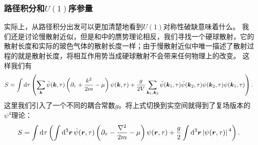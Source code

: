\documentclass[hyperref, UTF8, a4paper]{ctexart}
\begin{document}
\subsubsection{路径积分和$U(1)$序参量}

实际上，从路径积分出发可以更加清楚地看到$U(1)$对称性破缺意味着什么。%
我们还是讨论慢散射近似，但是和中的赝势理论相反，我们寻找一个硬球散射，它的散射长度和实际的玻色气体的散射长度一样；由于慢散射近似中唯一描述了散射过程的就是散射长度，将相互作用势当成硬球散射不会带来任何物理上的改变。
这样我们有
\[
    S = \int \dd{\tau} \left( 
        \sum_{\vb*{k}} \bar{\psi}(\vb*{k}, \tau) \left( \partial_\tau + \frac{k^2}{2m} - \mu \right) \psi(\vb*{k}, \tau) 
        + \frac{g}{2V} \sum_{\vb*{k}_1, \vb*{k}_2} \bar{\psi}(\vb*{k}_1, \tau) \bar{\psi}(\vb*{k}_2, \tau) \psi(\vb*{k}_2, \tau) \psi(\vb*{k}_1, \tau) 
    \right).
\]
这里我们引入了一个不同的耦合常数$g$。将上式切换到实空间就得到了复场版本的$\psi^4$理论：
\begin{equation}
    S = \int \dd{\tau} \left( 
        \int \dd[3]{\vb*{r}} \bar{\psi}(\vb*{r}, \tau) \left( \partial_\tau - \frac{\laplacian}{2m} - \mu \right) \psi(\vb*{r}, \tau) 
        + \frac{g}{2} \int \dd[3]{\vb*{r}} \abs*{\psi(\vb*{r}, \tau)}^4 
    \right).
\end{equation}
\end{document}
